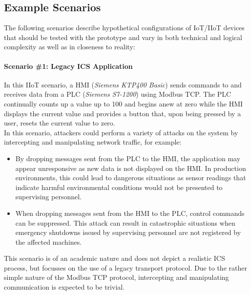 \subsection{Example Scenarios}
\label{sec:example-scenarios}
The following scenarios describe hypothetical configurations of \ac{IoT}/\ac{IIoT} devices that should be tested with the prototype and vary in both technical and logical complexity as well as in closeness to reality:

\paragraph{Scenario \#1: Legacy \ac{ICS} Application}
In this \ac{IIoT} scenario, a \ac{HMI} (\emph{Siemens KTP400 Basic}) sends commands to and receives data from a \ac{PLC} (\emph{Siemens S7-1200}) using Modbus \ac{TCP}. The \ac{PLC} continually counts up a value up to 100 and begins anew at zero while the \ac{HMI} displays the current value and provides a button that, upon being pressed by a user, resets the current value to zero. \\
In this scenario, attackers could perform a variety of attacks on the system by intercepting and manipulating network traffic, for example:
\begin{itemize}
    \item By dropping messages sent from the \ac{PLC} to the \ac{HMI}, the application may appear unresponsive as new data is not displayed on the \ac{HMI}. In production environments, this could lead to dangerous situations as sensor readings that indicate harmful environmental conditions would not be presented to supervising personnel.
    \item When dropping messages sent from the \ac{HMI} to the \ac{PLC}, control commands can be suppressed. This attack can result in catastrophic situations when emergency shutdowns issued by supervising personnel are not registered by the affected machines.
\end{itemize}
This scenario is of an academic nature and does not depict a realistic \ac{ICS} process, but focusses on the use of a legacy transport protocol. Due to the rather simple nature of the Modbus \ac{TCP} protocol, intercepting and manipulating communication is expected to be trivial. %

